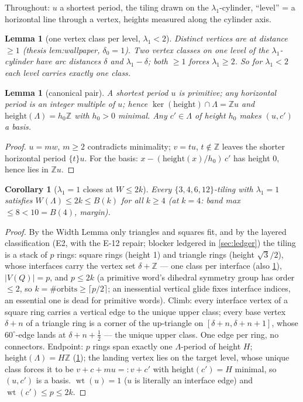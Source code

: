 \documentclass[11pt,a4paper,oneside]{article}
\theoremstyle{plain}
\newtheorem{lemma}[theorem]{Lemma}
\newtheorem{corollary}[theorem]{Corollary}
\theoremstyle{remark}
\DeclareMathOperator{\wt}{wt}
\newcommand{\ZZ}{\mathbb{Z}}
\newcommand{\Bk}{B(k)}
\begin{document}
Throughout: $u$ a shortest period, the tiling drawn on the $\lambda_1$-cylinder,
``level'' = a horizontal line through a vertex, heights measured along the cylinder axis.

\begin{lemma}[one vertex class per level, $\lambda_1 < 2$]\label{lem:L0a}
Distinct vertices are at distance $\ge 1$ (thesis \emph{lem:wallpaper}, $\delta_0 = 1$).
Two vertex classes on one level of the $\lambda_1$-cylinder have arc distances $\delta$ and
$\lambda_1 - \delta$; both $\ge 1$ forces $\lambda_1 \ge 2$. So for $\lambda_1 < 2$ each
level carries exactly one class.
\end{lemma}

\begin{lemma}[canonical pair]\label{lem:L0b}
A shortest period $u$ is primitive; any horizontal period is an integer multiple of $u$;
hence $\ker(\mathrm{height}) \cap \Lambda = \ZZ u$ and $\mathrm{height}(\Lambda) = h_0\ZZ$
with $h_0 > 0$ minimal. Any $c' \in \Lambda$ of height $h_0$ makes $(u, c')$ a basis.
\end{lemma}

\begin{proof}
$u = mw$, $m \ge 2$ contradicts minimality; $v = tu$, $t \notin \ZZ$ leaves the shorter
horizontal period $\{t\}u$. For the basis: $x - (\mathrm{height}(x)/h_0)\,c'$ has height
$0$, hence lies in $\ZZ u$.
\end{proof}

\begin{corollary}[$\lambda_1 = 1$ closes at $W \le 2k$]\label{cor:C1}
Every $\{3,4,6,12\}$-tiling with $\lambda_1 = 1$ satisfies $W(\Lambda) \le 2k \le \Bk$ for
all $k \ge 4$ (at $k = 4$: band max $\le 8 < 10 = B(4)$, margin).
\end{corollary}

\begin{proof}
By the Width Lemma only triangles and squares fit, and by the layered classification (E2,
with the E-12 repair; blocker ledgered in \cref{sec:ledger}) the tiling is a stack of $p$
rings: square rings (height 1) and triangle rings (height $\sqrt3/2$), whose interfaces
carry the vertex set $\delta + \ZZ$ --- one class per interface (also \cref{lem:L0a}),
$|V(Q)| = p$, and $p \le 2k$ (a primitive word's dihedral symmetry group has order
$\le 2$, so $k = \#\text{orbits} \ge \lceil p/2 \rceil$; an inessential vertical glide
fixes interface indices, an essential one is dead for primitive words). Climb: every
interface vertex of a square ring carries a vertical edge to the unique upper class; every
base vertex $\delta{+}n$ of a triangle ring is a corner of the up-triangle on
$[\delta{+}n, \delta{+}n{+}1]$, whose $60^\circ$-edge lands at $\delta{+}n{+}\tfrac12$ ---
the unique upper class. One edge per ring, no connectors. Endpoint: $p$ rings span exactly
one $\Lambda$-period of height $H$; $\mathrm{height}(\Lambda) = H\ZZ$ (\cref{lem:L0b});
the landing vertex lies on the target level, whose unique class forces it to be
$v + c + mu =: v + c'$ with $\mathrm{height}(c') = H$ minimal, so $(u, c')$ is a basis.
$\wt(u) = 1$ ($u$ is literally an interface edge) and $\wt(c') \le p \le 2k$.
\end{proof}
\end{document}
